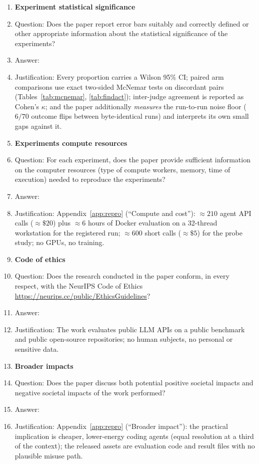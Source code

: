 \begin{enumerate}
\item {\bf Experiment statistical significance}
    \item[] Question: Does the paper report error bars suitably and correctly defined or other appropriate information about the statistical significance of the experiments?
    \item[] Answer: \answerYes{}
    \item[] Justification: Every proportion carries a Wilson 95\% CI; paired arm comparisons use exact two-sided McNemar tests on discordant pairs (Tables~\ref{tab:mcnemar}, \ref{tab:findact}); inter-judge agreement is reported as Cohen's $\kappa$; and the paper additionally \emph{measures} the run-to-run noise floor ($6/70$ outcome flips between byte-identical runs) and interprets its own small gaps against it.

\item {\bf Experiments compute resources}
    \item[] Question: For each experiment, does the paper provide sufficient information on the computer resources (type of compute workers, memory, time of execution) needed to reproduce the experiments?
    \item[] Answer: \answerYes{}
    \item[] Justification: Appendix~\ref{app:repro} (``Compute and cost''): ${\approx}210$ agent API calls (${\approx}\$20$) plus ${\approx}6$ hours of Docker evaluation on a 32-thread workstation for the registered run; ${\approx}600$ short calls (${\approx}\$5$) for the probe study; no GPUs, no training.

\item {\bf Code of ethics}
    \item[] Question: Does the research conducted in the paper conform, in every respect, with the NeurIPS Code of Ethics \url{https://neurips.cc/public/EthicsGuidelines}?
    \item[] Answer: \answerYes{}
    \item[] Justification: The work evaluates public LLM APIs on a public benchmark and public open-source repositories; no human subjects, no personal or sensitive data.

\item {\bf Broader impacts}
    \item[] Question: Does the paper discuss both potential positive societal impacts and negative societal impacts of the work performed?
    \item[] Answer: \answerYes{}
    \item[] Justification: Appendix~\ref{app:repro} (``Broader impact''): the practical implication is cheaper, lower-energy coding agents (equal resolution at a third of the context); the released assets are evaluation code and result files with no plausible misuse path.


\end{enumerate}
